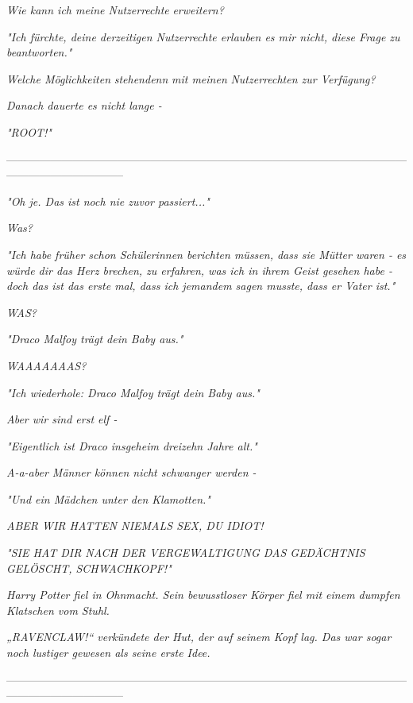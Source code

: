 {\emph{\emph{Wie kann ich meine Nutzer}\emph{rechte}} \emph{\emph{erweitern?}}

\emph{"\emph{Ich fürchte, deine derzeitigen Nutzerrechte erlauben es mir nicht, diese Frage zu beantworten.}"}

\emph{\emph{Welche Möglichkeiten}} \emph{stehen\emph{denn}} \emph{\emph{mit meine}\emph{n}} \emph{\emph{Nutzerrechten zur Verfügung?}}

\emph{Danach dauerte es nicht lange -}

\emph{"ROOT!"}

--------------------------------------------------------------------------------------------------------------------------------------------

\hfill\break \emph{"\emph{Oh je. Das ist noch nie zuvor passiert...}"}

\emph{\emph{Was?}}

\emph{"\emph{Ich habe früher schon Schülerinnen berichten müssen, dass sie Mütter waren - es würde dir das Herz brechen, zu erfahren, was ich in ihrem Geist gesehen habe - doch das ist das erste mal, dass ich jemandem sagen musste, dass er Vater ist.}"}

\emph{\emph{WAS?}}

\emph{"\emph{Draco Malfoy trägt dein Baby aus.}"}

\emph{\emph{WAAAAAAAS?}}

\emph{"\emph{Ich wiederhole: Draco Malfoy trägt dein Baby aus.}"}

\emph{\emph{Aber wir sind erst elf -}}

\emph{"\emph{Eigentlich ist Draco insgeheim dreizehn Jahre alt.}"}

\emph{\emph{A-a-aber Männer können nicht schwanger werden -}}

\emph{"\emph{Und ein Mädchen unter den Klamotten.}"}

\emph{\emph{ABER WIR HATTEN NIEMALS SEX, DU IDIOT!}}

\emph{"\emph{SIE HAT DIR NACH DER VERGEWALTIGUNG DAS GEDÄCHTNIS GELÖSCHT, SCHWACHKOPF!}"}

\emph{Harry Potter fiel in Ohnmacht. Sein bewusstloser Körper fiel mit einem dumpfen Klatschen vom Stuhl.}

\emph{„RAVENCLAW!“ verkündete der Hut, der auf seinem Kopf lag. Das war sogar noch lustiger gewesen als seine erste Idee.}

--------------------------------------------------------------------------------------------------------------------------------------------

}
